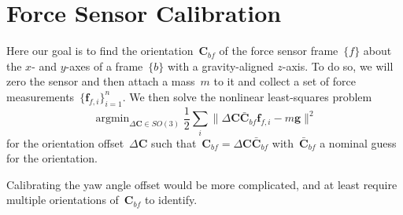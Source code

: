 \documentclass{article}
\DeclareMathOperator*{\argmin}{argmin}
\begin{document}
\section{Force Sensor Calibration}

Here our goal is to find the orientation~$\bm{C}_{bf}$ of the force sensor
frame~$\{f\}$ about the $x$- and $y$-axes of a frame~$\{b\}$ with a gravity-aligned
$z$-axis. To do so, we will zero the sensor and then attach a mass~$m$ to it
and collect a set of force measurements~$\{\bm{f}_{f,i}\}_{i=1}^n$. We then
solve the nonlinear least-squares problem
\begin{equation*}
  \argmin_{\Delta\bm{C}\in SO(3)} \frac{1}{2}\sum_i\|\Delta\bm{C}\bar{\bm{C}}_{bf}\bm{f}_{f,i}-m\bm{g}\|^2
\end{equation*}
for the orientation offset~$\Delta\bm{C}$ such
that~$\bm{C}_{bf}=\Delta\bm{C}\bar{\bm{C}}_{bf}$ with~$\bar{\bm{C}}_{bf}$ a
nominal guess for the orientation.

Calibrating the yaw angle offset would be more complicated, and at least
require multiple orientations of~$\bm{C}_{bf}$ to identify.
\end{document}
